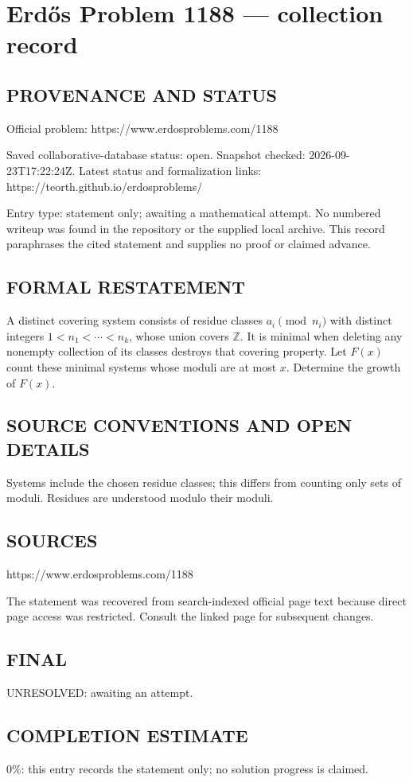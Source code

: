 \section*{Erd\H{o}s Problem 1188 --- collection record}

\subsection*{PROVENANCE AND STATUS}
Official problem: https://www.erdosproblems.com/1188

Saved collaborative-database status: open.
Snapshot checked: 2026-09-23T17:22:24Z.
Latest status and formalization links: https://teorth.github.io/erdosproblems/

Entry type: statement only; awaiting a mathematical attempt. No numbered writeup was found in the repository or the supplied local archive. This record paraphrases the cited statement and supplies no proof or claimed advance.

\subsection*{FORMAL RESTATEMENT}
A distinct covering system consists of residue classes $a_i\pmod{n_i}$ with distinct integers $1<n_1<\cdots<n_k$, whose union covers $\mathbb Z$. It is minimal when deleting any nonempty collection of its classes destroys that covering property. Let $F(x)$ count these minimal systems whose moduli are at most $x$. Determine the growth of $F(x)$.

\subsection*{SOURCE CONVENTIONS AND OPEN DETAILS}
Systems include the chosen residue classes; this differs from counting only sets of moduli. Residues are understood modulo their moduli.

\subsection*{SOURCES}
https://www.erdosproblems.com/1188

The statement was recovered from search-indexed official page text because direct page access was restricted. Consult the linked page for subsequent changes.

\subsection*{FINAL}
UNRESOLVED: awaiting an attempt.

\subsection*{COMPLETION ESTIMATE}
$0\%$: this entry records the statement only; no solution progress is claimed.
